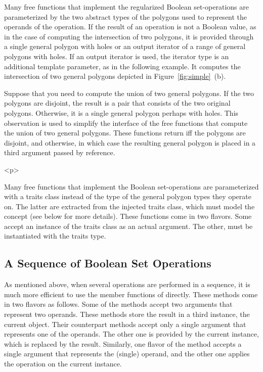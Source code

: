 Many free functions that implement the regularized Boolean 
set-operations are parameterized by the two abstract types of the polygons 
used to represent the operands of the operation. 
If the result of an operation is not a Boolean value, as in the case of 
computing the intersection of two polygons, it is provided through a single 
general polygon with holes or an output iterator of a range of general
polygons with holes. If an output iterator is used, the iterator type is an 
additional template parameter, as in the following example. It 
computes the intersection of two general polygons depicted in 
Figure~\ref{fig:simple}~(b).


Suppose that you need to compute the union of two general polygons. If the
two polygons are disjoint, the result is a pair that consists of the two 
original polygons. Otherwise, it is a single general polygon perhaps with 
holes. This observation is used to simplify the interface of the free
functions that compute the union of two general polygons. These functions
return  iff the polygons are disjoint, and  otherwise,
in which case the resulting general polygon is placed in a third argument 
passed by reference.

\begin{ccHtmlOnly}<p>\end{ccHtmlOnly}
Many free functions that implement the Boolean set-operations are
parameterized with a traits class instead of the type of the general
polygon types they operate on. The latter are extracted from the injected
traits class, which must model the concept 
 (see below for more details).
These functions come in two flavors. Some accept an instance of the traits 
class as an actual argument. The other, must be instantiated with the 
traits type.

\subsection{A Sequence of Boolean Set Operations}
\label{bso_ssec:sequence}
As mentioned above, when several operations are performed in a 
sequence, it is much more efficient to use the member functions of
 directly.
These methods come in two flavors as follows. Some of the methods accept two
arguments that represent two operands. These methods store the result
in a third instance, the current object. Their counterpart methods
accept only a single argument that represents one of the operands.
The other one is provided by the current instance, which is replaced by
the result. Similarly, one flavor of the  method
accepts a single argument that represents the (single) operand, and the 
other one applies the operation on the current instance.

